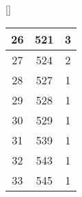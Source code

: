 \begin{center}[]
\begin{longtable}{|c|c|c|}
		26  & 521           & 3          \\ \hline
		27  & 524           & 2          \\ \hline
		28  & 527           & 1          \\ \hline
		29  & 528           & 1          \\ \hline
		30  & 529           & 1          \\ \hline
		31  & 539           & 1          \\ \hline
		32  & 543           & 1          \\ \hline
		33  & 545           & 1          \\ \hline
	\end{longtable}
\end{center}